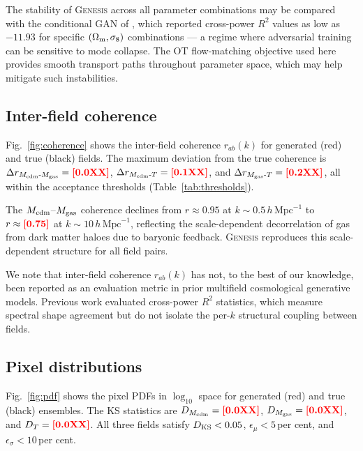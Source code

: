 \documentclass[usenatbib]{mnras}
\newcommand{\FILL}[1]{\textcolor{red}{\textbf{[#1]}}}
\newcommand{\Mcdm}{M_{\rm cdm}}
\newcommand{\Mgas}{M_{\rm gas}}
\newcommand{\Tgas}{T}
\newcommand{\Om}{\Omega_{\rm m}}
\newcommand{\sig}{\sigma_8}
\begin{document}
The stability of \textsc{Genesis} across all parameter combinations
may be compared with the conditional GAN of \citet{Andrianomena2024},
which reported cross-power $R^2$ values as low as $-11.93$ for
specific $(\Om, \sig)$ combinations --- a regime where adversarial
training can be sensitive to mode collapse.
The OT flow-matching objective used here provides smooth transport
paths throughout parameter space, which may help mitigate such
instabilities.

\subsection{Inter-field coherence}
\label{sec:res_coherence}

Fig.~\ref{fig:coherence} shows the inter-field coherence $r_{ab}(k)$
for generated (red) and true (black) fields.
The maximum deviation from the true coherence is
$\Delta r_{\Mcdm\text{-}\Mgas} = \FILL{0.0XX}$,
$\Delta r_{\Mcdm\text{-}\Tgas} = \FILL{0.1XX}$, and
$\Delta r_{\Mgas\text{-}\Tgas} = \FILL{0.2XX}$,
all within the acceptance thresholds (Table~\ref{tab:thresholds}).

The $\Mcdm$--$\Mgas$ coherence declines from $r \approx 0.95$ at
$k \sim 0.5\,h\,\mathrm{Mpc}^{-1}$ to $r \approx \FILL{0.75}$ at
$k \sim 10\,h\,\mathrm{Mpc}^{-1}$, reflecting the scale-dependent
decorrelation of gas from dark matter haloes due to baryonic feedback.
\textsc{Genesis} reproduces this scale-dependent structure
for all field pairs.

We note that inter-field coherence $r_{ab}(k)$ has not, to the best
of our knowledge, been reported as an evaluation metric in prior
multifield cosmological generative models.
Previous work \citep{Andrianomena2022,Andrianomena2024} evaluated
cross-power $R^2$ statistics, which measure spectral shape agreement
but do not isolate the per-$k$ structural coupling between fields.

\subsection{Pixel distributions}
\label{sec:res_pdf}

Fig.~\ref{fig:pdf} shows the pixel PDFs in $\log_{10}$ space for
generated (red) and true (black) ensembles.
The KS statistics are
$D_{\Mcdm} = \FILL{0.0XX}$,
$D_{\Mgas} = \FILL{0.0XX}$,
and $D_{\Tgas} = \FILL{0.0XX}$.
All three fields satisfy $D_{\rm KS} < 0.05$,
$\epsilon_\mu < 5$\,per cent, and
$\epsilon_\sigma < 10$\,per cent.
\end{document}

